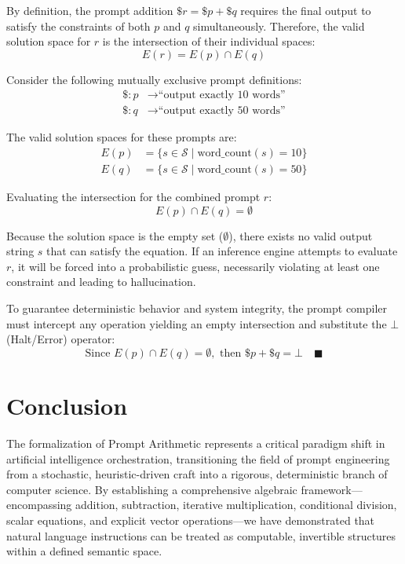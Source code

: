 \documentclass[11pt, a4paper]{article}
\begin{document}
By definition, the prompt addition $\$r = \$p + \$q$ requires the final output to satisfy the constraints of both $p$ and $q$ simultaneously. Therefore, the valid solution space for $r$ is the intersection of their individual spaces:
$$E(r) = E(p) \cap E(q)$$

Consider the following mutually exclusive prompt definitions:
\begin{align*}
    \$: p &\rightarrow \text{``output exactly 10 words''} \\
    \$: q &\rightarrow \text{``output exactly 50 words''}
\end{align*}

The valid solution spaces for these prompts are:
\begin{align*}
    E(p) &= \{ s \in \mathcal{S} \mid \text{word\_count}(s) = 10 \} \\
    E(q) &= \{ s \in \mathcal{S} \mid \text{word\_count}(s) = 50 \}
\end{align*}

Evaluating the intersection for the combined prompt $r$:
$$E(p) \cap E(q) = \emptyset$$

Because the solution space is the empty set ($\emptyset$), there exists no valid output string $s$ that can satisfy the equation. If an inference engine attempts to evaluate $r$, it will be forced into a probabilistic guess, necessarily violating at least one constraint and leading to hallucination.

To guarantee deterministic behavior and system integrity, the prompt compiler must intercept any operation yielding an empty intersection and substitute the $\bot$ (Halt/Error) operator:
$$\text{Since } E(p) \cap E(q) = \emptyset, \text{ then } \$p + \$q = \bot \quad \blacksquare$$

\section{Conclusion}
The formalization of Prompt Arithmetic represents a critical paradigm shift in artificial intelligence orchestration, transitioning the field of prompt engineering from a stochastic, heuristic-driven craft into a rigorous, deterministic branch of computer science. By establishing a comprehensive algebraic framework—encompassing addition, subtraction, iterative multiplication, conditional division, scalar equations, and explicit vector operations—we have demonstrated that natural language instructions can be treated as computable, invertible structures within a defined semantic space.
\end{document}
